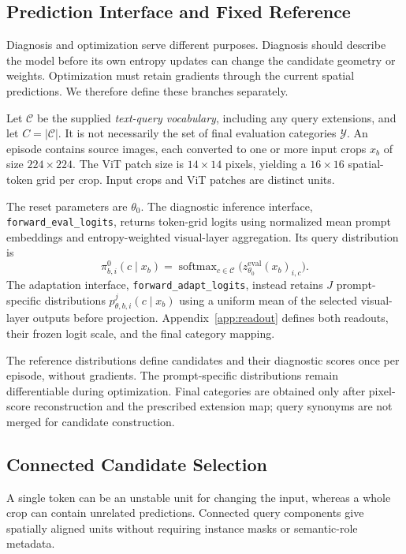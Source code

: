 \documentclass[letterpaper]{article}
\begin{document}
\subsection{Prediction Interface and Fixed Reference}
Diagnosis and optimization serve different purposes. Diagnosis should describe the model before its own entropy updates can change the candidate geometry or weights. Optimization must retain gradients through the current spatial predictions. We therefore define these branches separately.

Let $\mathcal C$ be the supplied \emph{text-query vocabulary}, including any query extensions, and let $C=|\mathcal C|$. It is not necessarily the set of final evaluation categories $\mathcal Y$. An episode contains source images, each converted to one or more input crops $x_b$ of size $224\times224$. The ViT patch size is $14\times14$ pixels, yielding a $16\times16$ spatial-token grid per crop. Input crops and ViT patches are distinct units.

The reset parameters are $\theta_0$. The diagnostic inference interface, \texttt{forward\_eval\_logits}, returns token-grid logits using normalized mean prompt embeddings and entropy-weighted visual-layer aggregation. Its query distribution is
\begin{equation}
\pi^0_{b,i}(c\mid x_b)=\operatorname{softmax}_{c\in\mathcal C}
\bigl(z^{\mathrm{eval}}_{\theta_0}(x_b)_{i,c}\bigr).
\label{eq:reference}
\end{equation}
The adaptation interface, \texttt{forward\_adapt\_logits}, instead retains $J$ prompt-specific distributions $p^j_{\theta,b,i}(c\mid x_b)$ using a uniform mean of the selected visual-layer outputs before projection. Appendix~\ref{app:readout} defines both readouts, their frozen logit scale, and the final category mapping.

The reference distributions define candidates and their diagnostic scores once per episode, without gradients. The prompt-specific distributions remain differentiable during optimization. Final categories are obtained only after pixel-score reconstruction and the prescribed extension map; query synonyms are not merged for candidate construction.

\subsection{Connected Candidate Selection}
A single token can be an unstable unit for changing the input, whereas a whole crop can contain unrelated predictions. Connected query components give spatially aligned units without requiring instance masks or semantic-role metadata.
\end{document}

